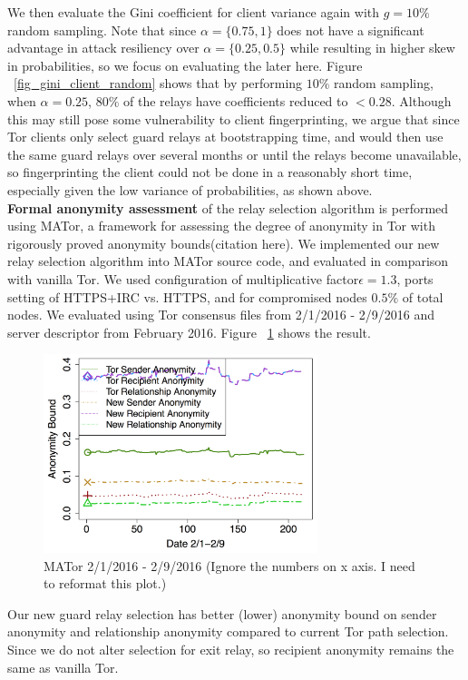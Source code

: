 We then evaluate the Gini coefficient for client variance again with $g=10\%$ random sampling. Note that since $\alpha=\{0.75,1\}$ does not have a significant advantage in attack resiliency over $\alpha=\{0.25,0.5\}$ while resulting in higher skew in probabilities, so we focus on evaluating the later here. Figure ~\ref{fig_gini_client_random} shows that by performing $10\%$ random sampling, when $\alpha=0.25$, $80\%$ of the relays have coefficients reduced to $< 0.28$. Although this may still pose some vulnerability to client fingerprinting, we argue that since Tor clients only select guard relays at bootstrapping time, and would then use the same guard relays over several months or until the relays become unavailable, so fingerprinting the client could not be done in a reasonably short time, especially given the low variance of probabilities, as shown above.\\



\textbf{Formal anonymity assessment} of the relay selection algorithm is performed using MATor, a framework for assessing the degree of anonymity in Tor with rigorously proved anonymity bounds(citation here). We implemented our new relay selection algorithm into MATor source code, and evaluated in comparison with vanilla Tor. We used configuration of multiplicative factor$\epsilon=1.3$, ports setting of HTTPS+IRC vs. HTTPS, and for compromised nodes $0.5\%$ of total nodes. We evaluated using Tor consensus files from 2/1/2016 - 2/9/2016 and server descriptor from February 2016. Figure ~\ref{fig_mator} shows the result. 

\begin{figure}[ht!]
\centering
\includegraphics[width=80mm]{figure/mator}
\caption{MATor 2/1/2016 - 2/9/2016 (Ignore the numbers on x axis. I need to reformat this plot.) \label{fig_mator}}
\end{figure}

Our new guard relay selection has better (lower) anonymity bound on sender anonymity and relationship anonymity compared to current Tor path selection. Since we do not alter selection for exit relay, so recipient anonymity remains the same as vanilla Tor. 


